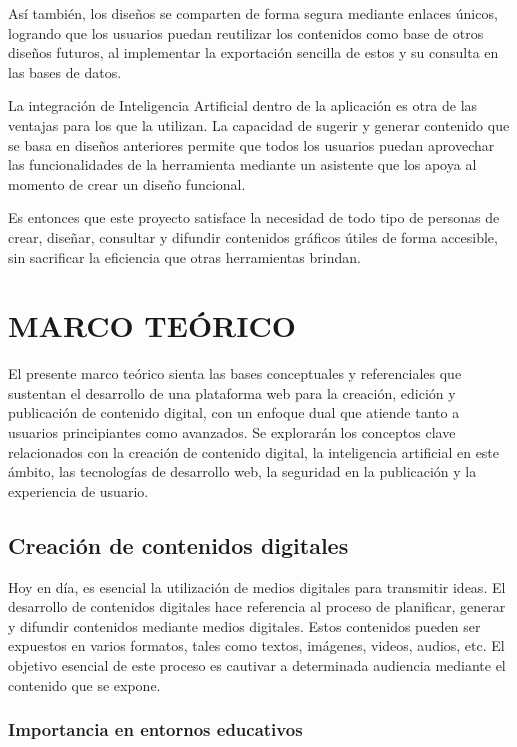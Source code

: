 \documentclass[12pt,a4paper]{report}
\begin{document}
Así también, los diseños se comparten de forma segura mediante enlaces únicos, logrando que los usuarios puedan reutilizar los contenidos como base de otros diseños futuros, al implementar la exportación sencilla de estos y su consulta en las bases de datos.

La integración de Inteligencia Artificial dentro de la aplicación es otra de las ventajas para los que la utilizan. La capacidad de sugerir y generar contenido que se basa en diseños anteriores permite que todos los usuarios puedan aprovechar las funcionalidades de la herramienta mediante un asistente que los apoya al momento de crear un diseño funcional.

Es entonces que este proyecto satisface la necesidad de todo tipo de personas de crear, diseñar, consultar y difundir contenidos gráficos útiles de forma accesible, sin sacrificar la eficiencia que otras herramientas brindan.

\chapter{MARCO TEÓRICO}

El presente marco teórico sienta las bases conceptuales y referenciales que sustentan el desarrollo de una plataforma web para la creación, edición y publicación de contenido digital, con un enfoque dual que atiende tanto a usuarios principiantes como avanzados. Se explorarán los conceptos clave relacionados con la creación de contenido digital, la inteligencia artificial en este ámbito, las tecnologías de desarrollo web, la seguridad en la publicación y la experiencia de usuario.

\section{Creación de contenidos digitales}

Hoy en día, es esencial la utilización de medios digitales para transmitir ideas. El desarrollo de contenidos digitales hace referencia al proceso de planificar, generar y difundir contenidos mediante medios digitales. Estos contenidos pueden ser expuestos en varios formatos, tales como textos, imágenes, videos, audios, etc. El objetivo esencial de este proceso es cautivar a determinada audiencia mediante el contenido que se expone.

\subsection{Importancia en entornos educativos}
\end{document}
